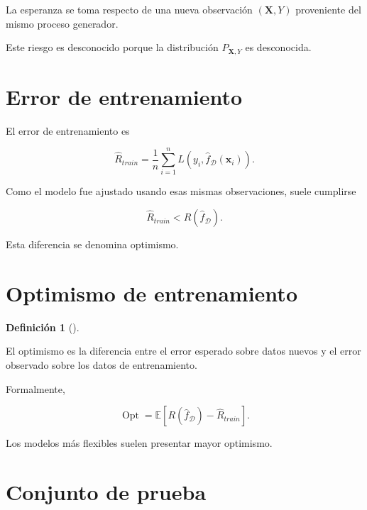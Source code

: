 \documentclass[
  spanish,
  10.5pt,
  letterpaper,
  DIV=11,
  numbers=noendperiod,
  oneside,
  open=any]{scrreprt}
\theoremstyle{definition}
\newtheorem{definition}{Definición}[chapter]
\theoremstyle{definition}
\theoremstyle{plain}
\theoremstyle{remark}
\begin{document}
La esperanza se toma respecto de una nueva observación
\((\mathbf{X},Y)\) proveniente del mismo proceso generador.

Este riesgo es desconocido porque la distribución \(P_{\mathbf{X},Y}\)
es desconocida.

\section*{Error de entrenamiento}\label{error-de-entrenamiento-1}


El error de entrenamiento es

\[
\widehat{R}_{train}
=
\frac{1}{n}
\sum_{i=1}^{n}
L
\left(
y_i,
\widehat{f}_{\mathcal{D}}(\mathbf{x}_i)
\right).
\]

Como el modelo fue ajustado usando esas mismas observaciones, suele
cumplirse

\[
\widehat{R}_{train}
<
R(\widehat{f}_{\mathcal{D}}).
\]

Esta diferencia se denomina optimismo.

\section*{Optimismo de entrenamiento}\label{optimismo-de-entrenamiento}


\begin{definition}[]\protect\hypertarget{def-optimismo}{}\label{def-optimismo}

El optimismo es la diferencia entre el error esperado sobre datos nuevos
y el error observado sobre los datos de entrenamiento.

\end{definition}

Formalmente,

\[
\operatorname{Opt}
=
\mathbb{E}
\left[
R(\widehat{f}_{\mathcal{D}})
-
\widehat{R}_{train}
\right].
\]

Los modelos más flexibles suelen presentar mayor optimismo.

\section*{Conjunto de prueba}\label{conjunto-de-prueba}
\end{document}

